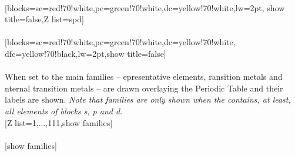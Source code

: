\\ [5pt][blocks={sc=red!70!white,pc=green!70!white,dc=yellow!70!white,lw=2pt}, show title=false,Z list=spd]%
\\ [5pt]\makebox[\linewidth][c]{\scalebox{.6}{\pgfPT[blocks={sc=red!70!white,pc=green!70!white,dc=yellow!70!white,lw=2pt},show title=false,Z list=spd]}}%
\\ [10pt][blocks={sc=red!70!white,pc=green!70!white,dc=yellow!70!white, dfc=yellow!70!black,lw=2pt},show title=false]%
\\ [5pt]\makebox[\linewidth][c]{\scalebox{.6}{\pgfPT[blocks={sc=red!70!white,pc=green!70!white,dc=yellow!70!white, dfc=yellow!70!black,lw=2pt},show title=false]}}%
\\ [0pt]\pgfPTendstyle%
\newpage%
\label{option_show families}%
%
{When set to  the main families -- epresentative elements, ransition metals and nternal transition metals -- are drawn overlaying the Periodic Table and their labels are shown. \textit{Note that families are only shown when the  contains, at least, all elements of blocks s, p and d}.
}%
\\ [5pt][Z list={1,...,111},show families]%
\\ [5pt]\makebox[\linewidth][c]{\scalebox{.6}{\pgfPT[Z list={1,...,111},show families]}}%
\\ [10pt][show families]%
\\ [5pt]\makebox[\linewidth][c]{\scalebox{.6}{\pgfPT[show families]}}%
\newpage%
